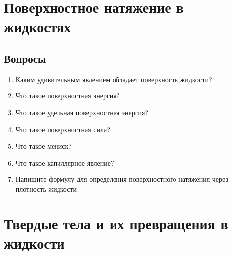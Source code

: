 \documentclass[12pt,a4paper]{report}
\begin{document}
\chapter{Поверхностное натяжение в жидкостях}
\section{Вопросы}
\begin{enumerate}
\item Каким удивительным явлением обладает поверхность жидкости?
\item Что такое поверхностная энергия?
\item Что такое удельная поверхностная энергия?
\item Что такое поверхностная сила?
\item Что такое мениск?
\item Что такое капиллярное явление?
\item Напишите формулу для определения поверхностного натяжения через плотность жидкости
\end{enumerate}

\chapter{Твердые тела и их превращения в жидкости}
\end{document}
